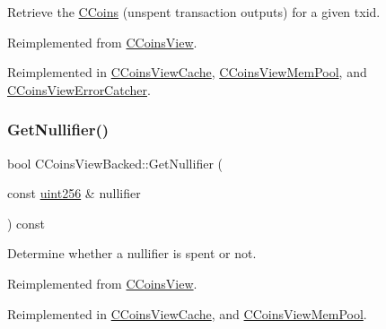Retrieve the \mbox{\hyperlink{class_c_coins}{C\+Coins}} (unspent transaction outputs) for a given txid. 



Reimplemented from \mbox{\hyperlink{class_c_coins_view_a67d865358127bef1f0011a23d5158a9f}{C\+Coins\+View}}.



Reimplemented in \mbox{\hyperlink{class_c_coins_view_cache_a1b62444593fdb580bfa4bd6fab41fafa}{C\+Coins\+View\+Cache}}, \mbox{\hyperlink{class_c_coins_view_mem_pool_a1a4a556821b1680ff4b73758c8a1e471}{C\+Coins\+View\+Mem\+Pool}}, and \mbox{\hyperlink{class_c_coins_view_error_catcher_a909f7b9e364b6f06bfea955209aa015d}{C\+Coins\+View\+Error\+Catcher}}.

\mbox{\label{class_c_coins_view_backed_afbfee79b18b475d67cd757a7dc4f5955}} 
\subsubsection{\texorpdfstring{Get\+Nullifier()}{GetNullifier()}}
{\footnotesize\ttfamily bool C\+Coins\+View\+Backed\+::\+Get\+Nullifier (\begin{DoxyParamCaption}\item[{const \mbox{\hyperlink{classuint256}{uint256}} \&}]{nullifier }\end{DoxyParamCaption}) const\hspace{0.3cm}{\ttfamily [virtual]}}



Determine whether a nullifier is spent or not. 



Reimplemented from \mbox{\hyperlink{class_c_coins_view_a45a7abe02d0d9d1b61a09dec70a3311f}{C\+Coins\+View}}.



Reimplemented in \mbox{\hyperlink{class_c_coins_view_cache_a72dd0d15434f85d518f23a278e813a03}{C\+Coins\+View\+Cache}}, and \mbox{\hyperlink{class_c_coins_view_mem_pool_ac76524f89eb1a8c25e3c6c3201d3662a}{C\+Coins\+View\+Mem\+Pool}}.

\mbox{\label{class_c_coins_view_backed_aa787da5760afa843d32764b70420b2d6}} 
